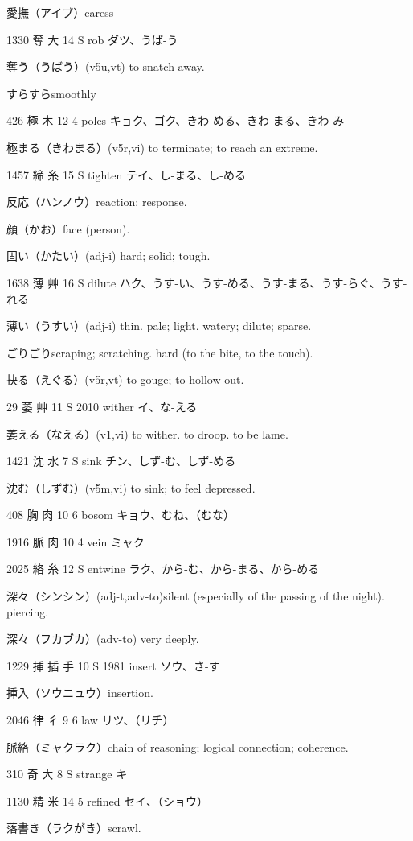 愛撫（アイブ）caress

1330	奪		大	14	S		rob	ダツ、うば-う

奪う（うばう）(v5u,vt) to snatch away.

すらすらsmoothly

426	極		木	12	4		poles	キョク、ゴク、きわ-める、きわ-まる、きわ-み

極まる（きわまる）(v5r,vi) to terminate; to reach an extreme.

1457	締		糸	15	S		tighten	テイ、し-まる、し-める

反応（ハンノウ）reaction; response.

顔（かお）face (person).

固い（かたい）(adj-i) hard; solid; tough.

1638	薄		艸	16	S		dilute	ハク、うす-い、うす-める、うす-まる、うす-らぐ、うす-れる

薄い（うすい）(adj-i) thin. pale; light. watery; dilute; sparse.

ごりごりscraping; scratching. hard (to the bite, to the touch).

抉る（えぐる）(v5r,vt) to gouge; to hollow out.

29	萎		艸	11	S	2010	wither	イ、な-える

萎える（なえる）(v1,vi) to wither. to droop. to be lame.

1421	沈		水	7	S		sink	チン、しず-む、しず-める

沈む（しずむ）(v5m,vi) to sink; to feel depressed.

408	胸		肉	10	6		bosom	キョウ、むね、（むな）

1916	脈		肉	10	4		vein	ミャク

2025	絡		糸	12	S		entwine	ラク、から-む、から-まる、から-める

深々（シンシン）(adj-t,adv-to)silent (especially of the passing of the night). piercing.

深々（フカブカ）(adv-to) very deeply.

1229	挿	插	手	10	S	1981	insert	ソウ、さ-す

挿入（ソウニュウ）insertion.

2046	律		彳	9	6		law	リツ、（リチ）

脈絡（ミャクラク）chain of reasoning; logical connection; coherence.

310	奇		大	8	S		strange	キ

1130	精		米	14	5		refined	セイ、（ショウ）

落書き（ラクがき）scrawl.

